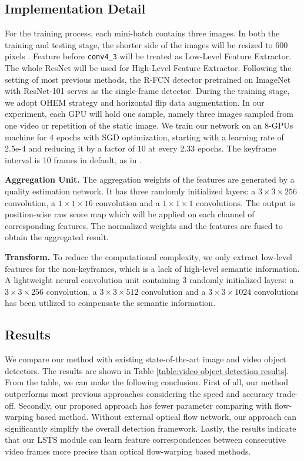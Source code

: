 \documentclass[runningheads]{llncs}
\begin{document}
\subsection{Implementation Detail}
For the training process, each mini-batch contains three images. In both the training and testing stage, the shorter side of the images will be resized to 600 pixels \cite{ren2015faster}.  Feature before \texttt{conv4\_3} will be treated as Low-Level Feature Extractor. The whole ResNet will be used for High-Level Feature Extractor. Following the setting of most previous methods, the R-FCN detector \cite{dai2016r} pretrained on ImageNet \cite{deng2009imagenet} with ResNet-101 \cite{he2016deep} serves as the single-frame detector. During the training stage, we adopt OHEM strategy \cite{shrivastava2016training} and horizontal flip data augmentation. In our experiment, each GPU will hold one sample, namely three images sampled from one video or repetition of the static image. We train our network on an 8-GPUs machine for 4 epochs with SGD optimization, starting with a learning rate of 2.5e-4 and reducing it by a factor of 10 at every 2.33 epochs. The keyframe interval is 10 frames in default, as in \cite{zhu2017deep,zhu2017flow}.

\noindent \textbf{Aggregation Unit.}
The aggregation weights of the features are generated by a quality estimation network. It has three randomly initialized layers: a $3 \times 3 \times 256$ convolution, a $1 \times 1 \times 16$ convolution and a $1 \times 1 \times 1$ convolutions. The output is position-wise raw score map which will be applied on each channel of corresponding features. The normalized weights and the features are fused to obtain the aggregated result.

\noindent \textbf{Transform.}
To reduce the computational complexity, we only extract low-level features for the non-keyframes, which is a lack of high-level semantic information. A lightweight neural convolution unit containing 3 randomly initialized layers: a $3 \times 3 \times 256$ convolution, a $3 \times 3 \times 512$ convolution and a $3 \times 3 \times 1024$ convolutions has been utilized to compensate the semantic information.

\subsection{Results}

We compare our method with existing state-of-the-art image and video object detectors. The results are shown in Table \ref{table:video object detection results}. From the table, we can make the following conclusion. First of all, our method outperforms most previous approaches considering the speed and accuracy trade-off. Secondly, our proposed approach has fewer parameter comparing with flow-warping based method. Without external optical flow network, our approach can significantly simplify the overall detection framework. Lastly, the results indicate that our LSTS module can learn feature correspondences between consecutive video frames more precise than optical flow-warping based methods.
\end{document}
